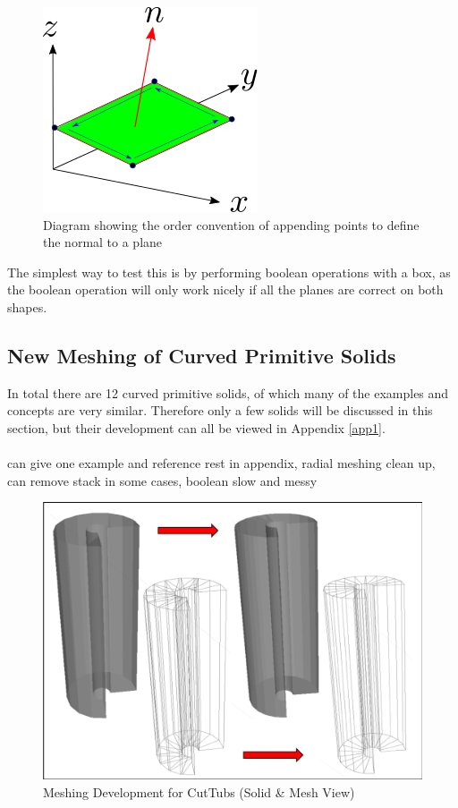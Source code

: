 \documentclass[12pt,a4paper]{article}
\begin{document}
\begin{figure}[h!]
\centering
\includegraphics[scale=0.75]{Images//append_points//Point_Appending_Order.png}
\caption[width=\columnwidth]{Diagram showing the order convention of appending points to define the normal to a plane}
\label{pointsorder}
\end{figure}
\noindent The simplest way to test this is by performing boolean operations with a box, as the boolean operation will only work nicely if all the planes are correct on both shapes.

\subsection{New Meshing of Curved Primitive Solids}
In total there are 12 curved primitive solids, of which many of the examples and concepts are very similar. Therefore only a few solids will be discussed in this section, but their development can all be viewed in Appendix \ref{app1}.
\\\\
can give one example and reference rest in appendix, radial meshing clean up, can remove stack in some cases, boolean slow and messy

\begin{figure}[h!]
\centering
\includegraphics[scale=0.5]{Images//Meshes//tubs.png}
\caption[width=\columnwidth]{Meshing Development for CutTubs (Solid \& Mesh View)}
\label{tubspic}
\end{figure}
\end{document}
